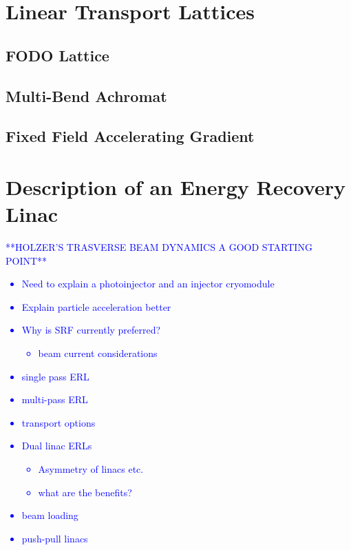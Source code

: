 \documentclass[../main.tex]{subfiles}
\begin{document}
\section{Linear Transport Lattices}

\subsection{FODO Lattice}

\subsection{Multi-Bend Achromat}

\subsection{Fixed Field Accelerating Gradient}


\section{Description of an Energy Recovery Linac}

\textcolor{blue}{**HOLZER'S TRASVERSE BEAM DYNAMICS A GOOD STARTING POINT**}

\textcolor{blue}{\begin{itemize}
    \item{Need to explain a photoinjector and an injector cryomodule}
    \item{Explain particle acceleration better}
    \item{Why is SRF currently preferred?
        \begin{itemize}
            \item{beam current considerations} 
        \end{itemize}}
    \item{single pass ERL}
    \item{multi-pass ERL}
    \item{transport options}
    \item{Dual linac ERLs
        \begin{itemize}
            \item{Asymmetry of linacs etc.}
            \item{what are the benefits?}
        \end{itemize}}
    \item{beam loading}
    \item{push-pull linacs}
\end{itemize}}
\end{document}
